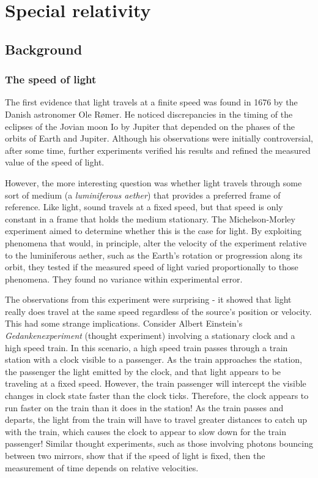 \chapter{Special relativity}

\section{Background}

\subsection{The speed of light}

The first evidence that light travels at a finite speed was found in 1676 by the Danish astronomer
Ole Rømer. He noticed discrepancies in the timing of the eclipses of the Jovian moon Io by Jupiter
that depended on the phases of the orbits of Earth and Jupiter. Although his observations were
initially controversial, after some time, further experiments verified his results and refined the
measured value of the speed of light.

However, the more interesting question was whether light travels through some sort of medium (a
\textit{luminiferous aether}) that provides a preferred frame of reference. Like light, sound
travels at a fixed speed, but that speed is only constant in a frame that holds the medium
stationary. The Michelson-Morley experiment aimed to determine whether this is the case for light.
By exploiting phenomena that would, in principle, alter the velocity of the experiment relative to
the luminiferous aether, such as the Earth's rotation or progression along its orbit, they tested
if the measured speed of light varied proportionally to those phenomena. They found no variance
within experimental error.

The observations from this experiment were surprising - it showed that light really does travel at
the same speed regardless of the source's position or velocity. This had some strange implications.
Consider Albert Einstein's \textit{Gedankenexperiment} (thought experiment) involving a stationary
clock and a high speed train. In this scenario, a high speed train passes through a train station
with a clock visible to a passenger. As the train approaches the station, the passenger the light
emitted by the clock, and that light appears to be traveling at a fixed speed. However, the train
passenger will intercept the visible changes in clock state faster than the clock ticks. Therefore,
the clock appears to run faster on the train than it does in the station! As the train passes and
departs, the light from the train will have to travel greater distances to catch up with the train,
which causes the clock to appear to slow down for the train passenger! Similar thought experiments,
such as those involving photons bouncing between two mirrors, show that if the speed of light is
fixed, then the measurement of time depends on relative velocities.

